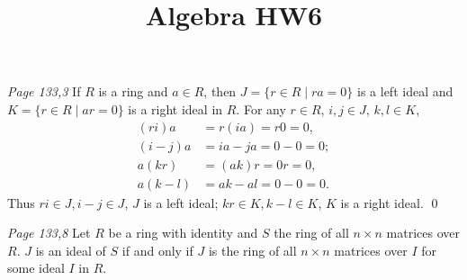 

\title{Algebra HW6}
\author{\asemail}
\maketitle

\begin{enumerate}
	\isep[1em]

\prob
\textit{Page 133,3 }%
If $R$ is a ring and $a\in R$, then $J=\{r\in R \mid ra=0\}$ is a left ideal and 
$K=\{r\in R \mid ar=0\}$ is a right ideal in $R$.
\soln
For any $r \in R$, $i,j\in J$, $k,l\in K$, 
\begin{align*}
	(ri)a & =r(ia) =r0=0, \\
	(i-j)a & =ia-ja=0-0=0; \\
	a(kr) & =(ak)r =0r=0, \\
	a(k-l) & =ak-al=0-0=0. 
\end{align*}
Thus $ri \in J, i-j \in J$, $J$ is a left ideal; $kr \in K, k-l \in K$, $K$ is a right ideal.
\qed

\prob
\textit{Page 133,8 }
Let $R$ be a ring with identity and $S$ the ring of all $n\times n$ matrices over $R$. 
$J$ is an ideal of $S$ if and only if $J$ is the ring of all $n\times n$ matrices over $I$ for some ideal $I$ in $R$. 


\end{enumerate}
